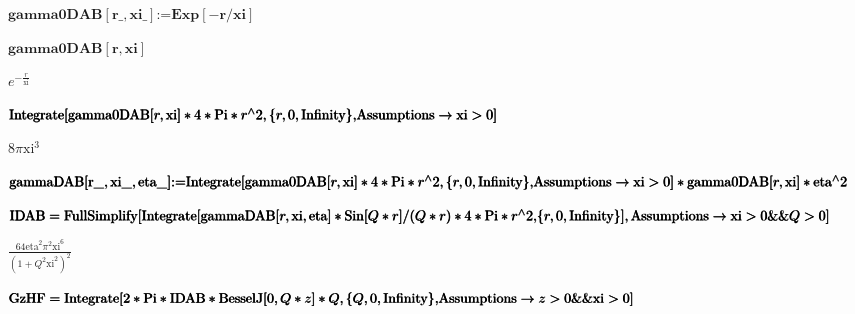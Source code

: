 \documentclass{article}
\begin{document}
\begin{doublespace}
\noindent\(\pmb{\text{gamma0DAB}[\text{r$\_$},\text{xi$\_$}]\text{:=}\text{Exp}[-r/\text{xi}]}\)
\end{doublespace}

\begin{doublespace}
\noindent\(\pmb{\text{gamma0DAB}[r,\text{xi}]}\)
\end{doublespace}

\begin{doublespace}
\noindent\(e^{-\frac{r}{\text{xi}}}\)
\end{doublespace}

\begin{doublespace}
\noindent\(\pmb{\text{Integrate}[\text{gamma0DAB}[r,\text{xi}]*4*\text{Pi}*r{}^{\wedge}2,\{r,0,\text{Infinity}\},}\\
\pmb{\text{Assumptions}\to \text{xi}>0]}\)
\end{doublespace}

\begin{doublespace}
\noindent\(8 \pi  \text{xi}^3\)
\end{doublespace}

\begin{doublespace}
\noindent\(\pmb{\text{gammaDAB}[\text{r$\_$},\text{xi$\_$},\text{eta$\_$}]\text{:=}}\\
\pmb{\text{Integrate}[\text{gamma0DAB}[r,\text{xi}]*4*\text{Pi}*r{}^{\wedge}2,\{r,0,\text{Infinity}\},}\\
\pmb{\text{Assumptions}\to \text{xi}>0]*\text{gamma0DAB}[r,\text{xi}]*\text{eta}{}^{\wedge}2}\)
\end{doublespace}

\begin{doublespace}
\noindent\(\pmb{\text{IDAB}=}\\
\pmb{\text{FullSimplify}[}\\
\pmb{\text{Integrate}[\text{gammaDAB}[r,\text{xi},\text{eta}]*\text{Sin}[Q*r]/(Q*r)*4*\text{Pi}*r{}^{\wedge}2,}\\
\pmb{\{r,0,\text{Infinity}\}],\text{Assumptions}\to \text{xi}>0\&\&Q>0]}\)
\end{doublespace}

\begin{doublespace}
\noindent\(\frac{64 \text{eta}^2 \pi ^2 \text{xi}^6}{\left(1+Q^2 \text{xi}^2\right)^2}\)
\end{doublespace}

\begin{doublespace}
\noindent\(\pmb{\text{GzHF}=\text{Integrate}[2*\text{Pi}*\text{IDAB}*\text{BesselJ}[0,Q*z]*Q,\{Q,0,\text{Infinity}\},}\\
\pmb{\text{Assumptions}\to z>0\&\&\text{xi}>0]}\)
\end{doublespace}
\end{document}

